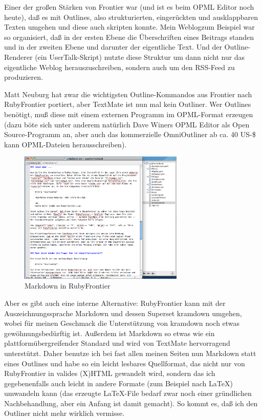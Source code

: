 \documentclass[11pt]{report}
\begin{document}
Einer der großen Stärken von Frontier war (und ist es beim OPML Editor
noch heute), daß es mit Outlines, also strukturierten, eingerückten
und ausklappbaren Texten umgehen und diese auch skripten konnte. Mein
Weblogzum Beispiel war so organisiert, daß in der ersten Ebene die
Überschriften eines Beitrags standen und in der zweiten Ebene und
darunter der eigentliche Text. Und der Outline-Renderer (ein
UserTalk-Skript) nutzte diese Struktur um dann nicht nur das
eigentliche Weblog herauszuschreiben, sondern auch um den RSS-Feed zu
produzieren.


Matt Neuburg hat zwar die wichtigsten Outline-Kommandos aus Frontier
nach RubyFrontier portiert, aber TextMate ist nun mal kein
Outliner. Wer Outlines benötigt, muß diese mit einem externen Programm
im OPML-Format erzeugen (dazu böte sich unter anderem natürlich Dave
Winers OPML Editor als Open Source-Programm an, aber auch das
kommerzielle OmniOutliner ab ca. 40 US-\$ kann OPML-Dateien
herausschreiben).


\begin{figure}[h!]
\centering
\includegraphics[width=0.7\textwidth]{./images/markdown-in-rubyfrontier.png}
\caption{\label{markdownrf}Markdown in RubyFrontier}
\end{figure}

Aber es gibt auch eine interne Alternative: RubyFrontier kann mit der
Auszeichnungssprache Markdown und dessen Superset kramdown umgehen,
wobei für meinen Geschmack die Unterstützung von kramdown noch etwas
gewöhnungsbedürftig ist. Außerdem ist Markdown so etwas wie ein
plattformübergreifender Standard und wird von TextMate hervorragend
unterstützt. Daher benutze ich bei fast allen meinen Seiten nun
Markdown statt eines Outlines und habe so ein leicht lesbares
Quellformat, das nicht nur von RubyFrontier in valides (X)HTML
gewandelt wird, sondern das ich gegebenenfalls auch leicht in andere
Formate (zum Beispiel nach \LaTeX{}) umwandeln kann (das erzeugte
\LaTeX{}-File bedarf zwar noch einer gründlichen Nachbehandlung, aber ein
Anfang ist damit gemacht). So kommt es, daß ich den Outliner nicht
mehr wirklich vermisse.
\end{document}
